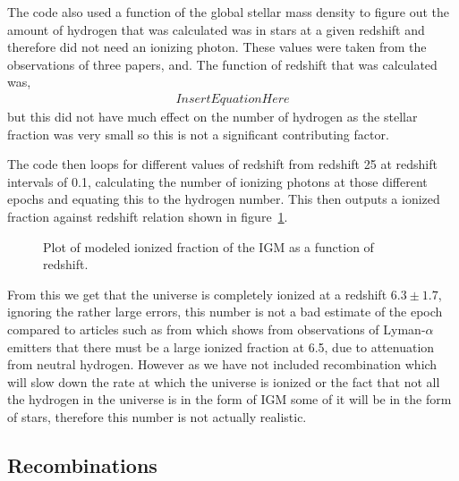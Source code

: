 	The code also used a function of the global stellar mass density to figure out the amount of hydrogen that was calculated was in stars at a given redshift and therefore did not need an ionizing photon. These values were taken from the observations of three papers\cite{2006AA...459..745F},\cite{2003AA...401...73W} and\cite{2003ApJS..149..289B}. The function of redshift that was calculated was,
	\begin{align}
		Insert Equation Here
	\end{align}
	but this did not have much effect on the number of hydrogen as the stellar fraction was very small so this is not a significant contributing factor.

	The code then loops for different values of redshift from redshift 25 at redshift intervals of 0.1, calculating the number of ionizing photons at those different epochs and equating this to the hydrogen number. This then outputs a ionized fraction against redshift relation shown in figure~\ref{fig:IonizedFraction1}.
	\begin{figure}[!htb]
		\centering
			\begingroup{}
		  		\resizebox{0.7\textwidth}{!}{%
					
		  		}\endgroup
		\caption{Plot of modeled ionized fraction of the IGM as a function of redshift.\label{fig:IonizedFraction1}}
	\end{figure}

	From this we get that the universe is completely ionized at a redshift $6.3\pm1.7$, ignoring the rather large errors, this number is not a bad estimate of the epoch compared to articles such as from\cite{OtaarXiv0707.1561} which shows from observations of Lyman-$\alpha$ emitters that there must be a large ionized fraction at 6.5, due to attenuation from neutral hydrogen. However as we have not included recombination which will slow down the rate at which the universe is ionized or the fact that not all the hydrogen in the universe is in the form of IGM some of it will be in the form of stars, therefore this number is not actually realistic.

\subsection{Recombinations} %
\label{sub:recombinations}

